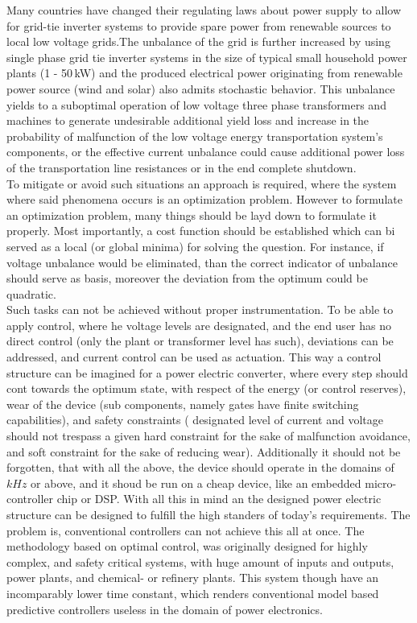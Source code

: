 Many countries have changed their regulating laws about power supply to allow for grid-tie inverter systems to provide spare power from renewable sources to local low voltage grids.The unbalance of the grid is further increased by using single phase grid tie inverter systems in the size of typical small household power plants (1 - 50\,kW) and the produced electrical power originating from renewable power source (wind and solar) also admits stochastic behavior. This unbalance yields to a suboptimal operation of low voltage three phase transformers and machines to generate undesirable additional yield loss and increase in the probability of malfunction of the low voltage energy transportation system's components, or the effective current unbalance could cause additional power loss of the transportation line resistances or in the end complete shutdown.\\
To mitigate or avoid such situations an approach is required, where the system where said phenomena occurs is an optimization problem. However to formulate an optimization problem, many things should be layd down to formulate it properly. Most importantly, a cost function should be established which can bi served as a local (or global minima) for solving the question. For instance, if voltage unbalance would be eliminated, than the correct indicator of unbalance should serve as basis, moreover the deviation from the optimum could be quadratic.\\
Such tasks can not be achieved without proper instrumentation. To be able to apply control, where he voltage levels are designated, and the end user has no direct control (only the plant or transformer level has such), deviations can be addressed, and current control can be used as actuation. This way a control structure can be imagined for a power electric converter, where every step should cont towards the optimum state, with respect of the energy (or control reserves), wear of the device (sub components, namely gates have finite switching capabilities), and  safety constraints ( designated level of current and voltage should not trespass a given hard constraint for the sake of malfunction avoidance, and soft constraint for the sake of reducing wear). Additionally it should not be forgotten, that with all the above, the device should operate in the domains of $kHz$ or above, and it shoud be run on a cheap device, like an embedded micro-controller chip or DSP. With all this in mind an the designed power electric structure can be designed to fulfill the high standers of today’s requirements. The problem is, conventional controllers can not achieve this all at once. The methodology based on optimal control, was originally designed for highly complex, and safety critical systems, with huge amount of inputs and outputs, power plants, and chemical- or refinery plants. This system though have an incomparably lower time constant, which renders conventional model based predictive controllers useless in the domain of power electronics. \\
